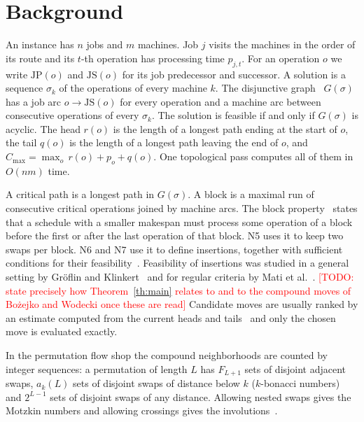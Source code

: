 \documentclass[10pt,twocolumn]{article}
\newcommand{\todo}[1]{\textcolor{red}{[TODO: #1]}}
\newcommand{\JP}{\mathrm{JP}}
\newcommand{\JS}{\mathrm{JS}}
\newcommand{\Cmax}{C_{\max}}
\begin{document}
\section{Background}

An instance has $n$ jobs and $m$ machines. Job $j$ visits the machines in
the order of its route and its $t$-th operation has processing time
$p_{j,t}$. For an operation $o$ we write $\JP(o)$ and $\JS(o)$ for its job
predecessor and successor. A solution is a sequence $\sigma_k$ of the
operations of every machine $k$. The disjunctive
graph~\cite{roy1964} $G(\sigma)$ has a job arc $o\to\JS(o)$ for every
operation and a machine arc between consecutive operations of every
$\sigma_k$. The solution is feasible if and only if $G(\sigma)$ is
acyclic. The head $r(o)$ is the length of a longest path ending at the
start of $o$, the tail $q(o)$ is the length of a longest path leaving the
end of $o$, and $\Cmax=\max_o\, r(o)+p_o+q(o)$. One topological pass
computes all of them in $O(nm)$ time.

A critical path is a longest path in $G(\sigma)$. A block is a maximal run
of consecutive critical operations joined by machine arcs. The block
property~\cite{brucker1994,nowicki1996} states that a schedule with a
smaller makespan must process some operation of a block before the first
or after the last operation of that block. N5 uses it to keep two swaps
per block. N6 and N7 use it to define insertions, together with sufficient
conditions for their feasibility~\cite{balas1998,zhang2007}. Feasibility
of insertions was studied in a general setting by Gr\"oflin and
Klinkert~\cite{groflin2007} and for regular criteria by Mati et
al.~\cite{mati2011}. \todo{state precisely how Theorem~\ref{th:main}
relates to \cite{groflin2007,mati2011,dauzere1997} and to the compound
moves of Bo\.zejko and Wodecki once these are read}
Candidate moves are usually ranked by an estimate computed from the
current heads and tails~\cite{taillard1994,balas1998} and only the chosen
move is evaluated exactly.

In the permutation flow shop the compound neighborhoods are counted by
integer sequences: a permutation of length $L$ has $F_{L+1}$ sets of
disjoint adjacent swaps, $a_k(L)$ sets of disjoint swaps of distance below
$k$ ($k$-bonacci numbers) and $2^{L-1}$ sets of disjoint swaps of any
distance. Allowing nested swaps gives the Motzkin numbers and allowing
crossings gives the involutions~\cite{motzkin_own}.
\end{document}
